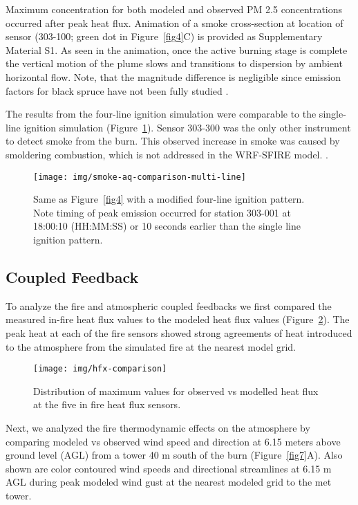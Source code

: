\documentclass[preprints,article,accept,moreauthors,pdftex]{Definitions/mdpi}
\begin{document}
Maximum concentration for both modeled and observed PM 2.5 concentrations occurred after peak heat flux.
Animation of a smoke cross-section at location of sensor (303-100; green dot in Figure~\ref{fig4}C) is provided as Supplementary Material S1. As seen in the animation, once the active burning stage is complete
the vertical motion of the plume slows and transitions to dispersion by ambient horizontal flow. Note, that the magnitude difference is negligible since emission factors for black spruce have not been fully studied \cite{prichard_wildland_2020}.

The results from the four-line ignition simulation were comparable to the single-line ignition simulation (Figure~\ref{fig5}). Sensor 303-300 was the only other instrument to detect smoke from the burn. This observed increase in smoke was caused by smoldering combustion, which is not addressed in the WRF-SFIRE model. \cite{mallia_incorporating_2020,mandel_coupled_2011,mandel_recent_2014}.

\begin{figure}[H]
\centering
 \texttt{[image: img/smoke-aq-comparison-multi-line]}
 \caption{Same as Figure~\ref{fig4} with a modified four-line ignition pattern. Note timing of peak emission occurred for station 303-001 at 18:00:10 (HH:MM:SS) or 10 seconds earlier than the single line ignition pattern.\label{fig5}}
 \end{figure}


\subsection{Coupled Feedback}

To analyze the fire and atmospheric coupled feedbacks we first compared the measured in-fire heat flux values to the modeled heat flux values (Figure~\ref{fig6}). The peak heat at each of the fire sensors showed strong agreements of heat introduced to the atmosphere from the simulated fire at the nearest model grid.

\begin{figure}[H]
\centering
 \texttt{[image: img/hfx-comparison]}
 \caption{Distribution of maximum values for observed vs modelled heat flux at the five in fire heat flux sensors.\label{fig6}}
 \end{figure}

Next, we analyzed the fire thermodynamic effects on the atmosphere by comparing modeled vs observed wind speed and direction at 6.15 meters above ground level (AGL) from a tower 40 m south of the burn (Figure~\ref{fig7}A). Also shown are color contoured wind speeds and directional streamlines at 6.15 m AGL during peak modeled wind gust at the nearest modeled grid to the met tower.
\end{document}
